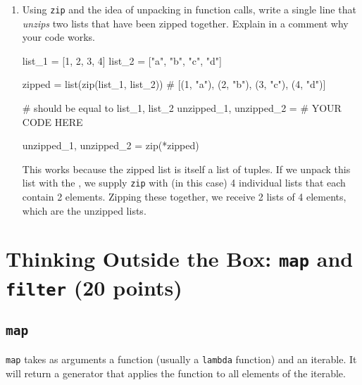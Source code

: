 \begin{enumerate}
    \item Using {\tt zip} and the idea of unpacking in function calls, write a single line that {\it unzips} two lists that have been zipped together. Explain in a comment why your code works.

    \begin{pythoncode}
list_1 = [1, 2, 3, 4]
list_2 = ["a", "b", "c", "d"]

zipped = list(zip(list_1, list_2))
# [(1, "a"), (2, "b"), (3, "c"), (4, "d")]

# should be equal to list_1, list_2
unzipped_1, unzipped_2 = # YOUR CODE HERE
    \end{pythoncode}

    \begin{solution}
        \begin{pythoncode}
unzipped_1, unzipped_2 = zip(*zipped)
        \end{pythoncode}

        This works because the zipped list is itself a list of tuples. If we unpack this list with the {\tt *}, we supply {\tt zip} with (in this case) 4 individual lists that each contain 2 elements. Zipping these together, we receive 2 lists of 4 elements, which are the unzipped lists.
    \end{solution}
\end{enumerate}


\section{Thinking Outside the Box: {\tt map} and {\tt filter} (20 points)}

\subsection{{\tt map}}

{\tt map} takes as arguments a function (usually a {\tt lambda} function) and an iterable. It will return a generator that applies the function to all elements of the iterable.

